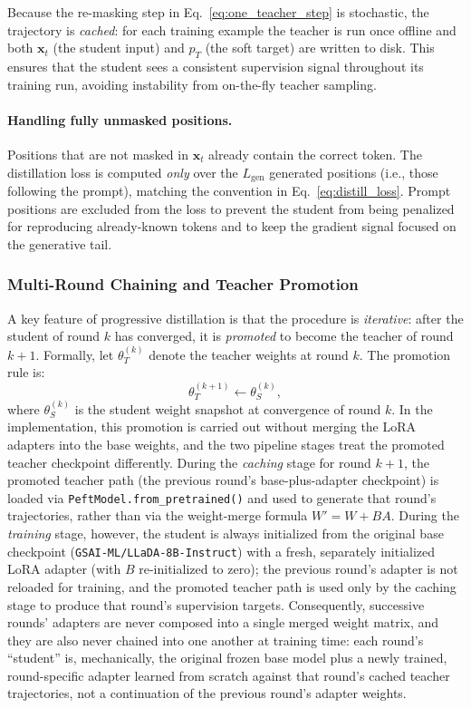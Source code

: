 \documentclass[11pt, a4paper]{article}
\begin{document}
Because the re-masking step in Eq.~\eqref{eq:one_teacher_step} is stochastic,
the trajectory is \emph{cached}: for each training example the teacher is run once
offline and both $\mathbf{x}_t$ (the student input) and $p_T$ (the soft target) are
written to disk. This ensures that the student sees a consistent supervision signal
throughout its training run, avoiding instability from on-the-fly teacher sampling.

\paragraph{Handling fully unmasked positions.}
Positions that are not masked in $\mathbf{x}_t$ already contain the correct token.
The distillation loss is computed \emph{only} over the $L_{\text{gen}}$ generated
positions (i.e., those following the prompt), matching the convention in
Eq.~\eqref{eq:distill_loss}. Prompt positions are excluded from the loss to prevent
the student from being penalized for reproducing already-known tokens and to keep the
gradient signal focused on the generative tail.

\subsubsection{Multi-Round Chaining and Teacher Promotion}
\label{subsubsec:multi_round}

A key feature of progressive distillation is that the procedure is \emph{iterative}:
after the student of round $k$ has converged, it is \emph{promoted} to become the
teacher of round $k+1$. Formally, let $\theta_T^{(k)}$ denote the teacher weights at
round $k$. The promotion rule is:
\begin{equation}
    \theta_T^{(k+1)} \leftarrow \theta_S^{(k)},
    \label{eq:promotion}
\end{equation}
where $\theta_S^{(k)}$ is the student weight snapshot at convergence of round $k$.
In the implementation, this promotion is carried out without merging the LoRA
adapters into the base weights, and the two pipeline stages treat the promoted
teacher checkpoint differently. During the \emph{caching} stage for round $k+1$,
the promoted teacher path (the previous round's base-plus-adapter checkpoint) is
loaded via \texttt{PeftModel.from\_pretrained()} and used to generate that round's
trajectories, rather than via the weight-merge formula $W' = W + BA$. During the
\emph{training} stage, however, the student is always initialized from the
original base checkpoint (\texttt{GSAI-ML/LLaDA-8B-Instruct}) with a fresh,
separately initialized LoRA adapter (with $B$ re-initialized to zero); the
previous round's adapter is not reloaded for training, and the promoted teacher
path is used only by the caching stage to produce that round's supervision
targets. Consequently, successive rounds' adapters are never composed into a
single merged weight matrix, and they are also never chained into one another at
training time: each round's ``student'' is, mechanically, the original frozen
base model plus a newly trained, round-specific adapter learned from scratch
against that round's cached teacher trajectories, not a continuation of the
previous round's adapter weights.
\end{document}
